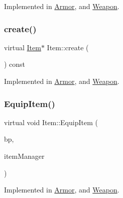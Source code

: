 Implemented in \mbox{\hyperlink{class_armor_aac8aec108de9a8a45bada1534c0f23b7}{Armor}}, and \mbox{\hyperlink{class_weapon_a4a914fa26d1d67a5d890252950f6b9be}{Weapon}}.

\mbox{\label{class_item_a17b3fa0cef44ada961e0d3c65e1de864}} 
\subsubsection{\texorpdfstring{create()}{create()}}
{\footnotesize\ttfamily virtual \mbox{\hyperlink{class_item}{Item}}$\ast$ Item\+::create (\begin{DoxyParamCaption}{ }\end{DoxyParamCaption}) const\hspace{0.3cm}{\ttfamily [pure virtual]}}



Implemented in \mbox{\hyperlink{class_armor_a21de0acaa6ecdb6f5937166b83da9b01}{Armor}}, and \mbox{\hyperlink{class_weapon_a0755dc1352391eb484644ab4e4cf144d}{Weapon}}.

\mbox{\label{class_item_ad1a25684e25e0fc14cbe88f77ea035c2}} 
\subsubsection{\texorpdfstring{Equip\+Item()}{EquipItem()}}
{\footnotesize\ttfamily virtual void Item\+::\+Equip\+Item (\begin{DoxyParamCaption}\item[{\mbox{\hyperlink{class_body_part}{Body\+Part}} \&}]{bp,  }\item[{\mbox{\hyperlink{class_item_manager}{Item\+Manager}} \&}]{item\+Manager }\end{DoxyParamCaption})\hspace{0.3cm}{\ttfamily [pure virtual]}}



Implemented in \mbox{\hyperlink{class_armor_a0b5dc1feb7b5d3c4bd023cf9e0857fe3}{Armor}}, and \mbox{\hyperlink{class_weapon_ab40ee049b9f2a5c3cfdec36750f0842d}{Weapon}}.

\mbox{\label{class_item_a9839c6a1b61487bbbe15b7ebba07de34}} 
